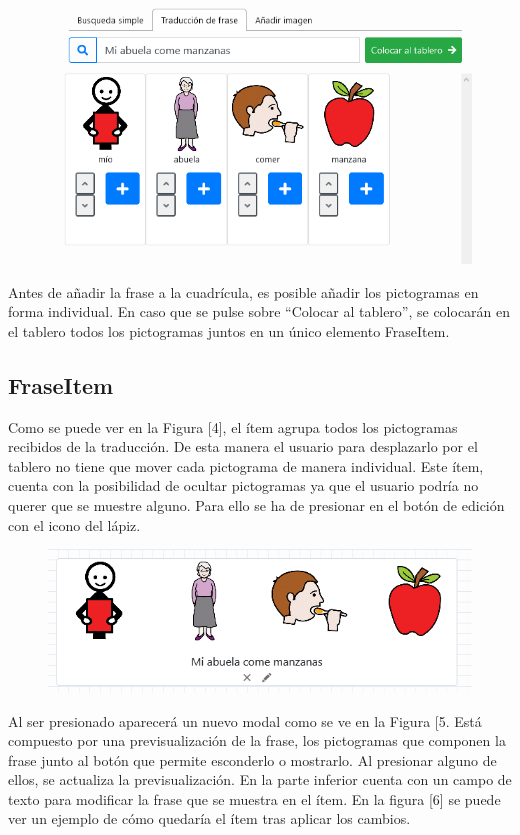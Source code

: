 \begin{figure}[h!]
	\centering
	\includegraphics[width=0.7\linewidth]{Imagenes/Bitmap/traduccionPicto}
	\caption{}
	\label{fig:traduccionpicto}
\end{figure}


Antes de añadir la frase a la cuadrícula, es posible añadir los pictogramas en forma individual. En caso que se pulse sobre “Colocar al tablero”, se colocarán en el tablero todos los pictogramas juntos en un único elemento FraseItem. 

\subsection{FraseItem}

Como se puede ver en la Figura [4], el ítem agrupa todos los pictogramas recibidos de la traducción. De esta manera el usuario para desplazarlo por el tablero no tiene que mover cada pictograma de manera individual. Este ítem, cuenta con la posibilidad de ocultar pictogramas ya que el usuario podría no querer que se muestre alguno. Para ello se ha de presionar en el botón de edición con el icono del lápiz. 

\begin{figure}[h!]
	\centering
	\includegraphics[width=0.7\linewidth]{Imagenes/Bitmap/fraseItemOriginal}
	\caption{}
	\label{fig:fraseitemoriginal}
\end{figure}


Al ser presionado aparecerá un nuevo modal como se ve en la Figura [5. Está compuesto por una previsualización de la frase, los pictogramas que componen la frase junto al botón que permite esconderlo o mostrarlo. Al presionar alguno de ellos, se actualiza la previsualización. En la parte inferior cuenta con un campo de texto para modificar la frase que se muestra en el ítem. En la figura [6] se puede ver un ejemplo de cómo quedaría el ítem tras aplicar los cambios. 

